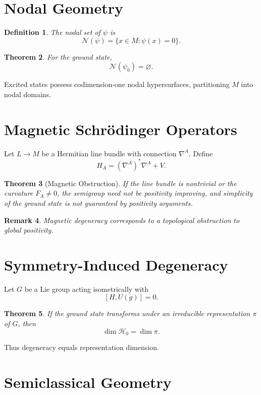 \documentclass[11pt]{article}
\newtheorem{theorem}{Theorem}[section]
\newtheorem{definition}[theorem]{Definition}
\newtheorem{remark}[theorem]{Remark}
\begin{document}
\section{Nodal Geometry}

\begin{definition}
The nodal set of $\psi$ is
\[
\mathcal N(\psi)=\{x\in M:\psi(x)=0\}.
\]
\end{definition}

\begin{theorem}
For the ground state,
\[
\mathcal N(\psi_0)=\varnothing.
\]
\end{theorem}

Excited states possess codimension-one nodal hypersurfaces, partitioning $M$ into nodal domains.

\section{Magnetic Schrödinger Operators}

Let $L\to M$ be a Hermitian line bundle with connection $\nabla^A$. Define
\[
H_A = (\nabla^A)^*\nabla^A + V.
\]

\begin{theorem}[Magnetic Obstruction]
If the line bundle is nontrivial or the curvature $F_A\neq 0$, 
the semigroup need not be positivity improving, and simplicity of the ground state 
is not guaranteed by positivity arguments.
\end{theorem}

\begin{remark}
Magnetic degeneracy corresponds to a topological obstruction to global positivity.
\end{remark}

\section{Symmetry-Induced Degeneracy}

Let $G$ be a Lie group acting isometrically with
\[
[H,U(g)] = 0.
\]

\begin{theorem}
If the ground state transforms under an irreducible representation $\pi$ of $G$, then
\[
\dim \mathcal H_0 = \dim \pi.
\]
\end{theorem}

Thus degeneracy equals representation dimension.

\section{Semiclassical Geometry}
\end{document}
